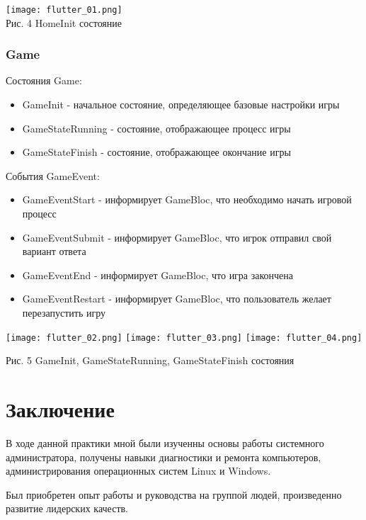 \documentclass[14pt, oneside]{altsu-report}
\begin{document}
\begin{center}
  \texttt{[image: flutter\_01.png]}\\

  Рис. 4 HomeInit состояние
\end{center}

\subsection*{Game}
Состояния Game:
\begin{itemize}
  \item GameInit - начальное состояние, определяющее базовые настройки игры
  \item GameStateRunning - состояние, отображающее процесс игры
  \item GameStateFinish - состояние, отображающее окончание игры
\end{itemize}

События GameEvent:
\begin{itemize}
  \item GameEventStart - информирует GameBloc, что необходимо начать игровой процесс
  \item GameEventSubmit - информирует GameBloc, что игрок отправил свой вариант ответа
  \item GameEventEnd - информирует GameBloc, что игра закончена
  \item GameEventRestart - информирует GameBloc, что пользователь желает перезапустить игру
\end{itemize}


\begin{center}
  \texttt{[image: flutter\_02.png]}
  \texttt{[image: flutter\_03.png]}
  \texttt{[image: flutter\_04.png]}

  Рис. 5 GameInit, GameStateRunning, GameStateFinish состояния
\end{center}




\chapter*{Заключение}
В ходе данной практики мной были изученны основы работы системного администратора, получены навыки диагностики и ремонта компьютеров, администрирования операционных систем Linux и Windows. 

Был приобретен опыт работы и руководства на группой людей, произведенно развитие лидерских качеств.
\end{document}
